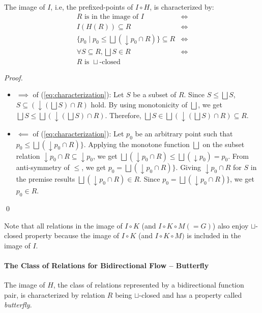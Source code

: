 \documentclass{llncs}
\newcommand{\join}{\sqcup}
\newcommand{\bigjoin}{\bigsqcup}
\newcommand{\comp}{\circ}
\begin{document}
  The image of $I$, i.e, the prefixed-points of $I \comp H$, is characterized by:
  \begin{align}
     R \text{ is in the image of } I &\iff \\
     I(H(R)) \subseteq R &\iff \\
     \{ p_{0} \mid p_{0} \leq \bigjoin (\downarrow p_{0} \cap R) \} \subseteq R &\iff \label{eq:characterization}\\
    \forall S \subseteq R, \bigjoin S \in R &\iff \\
    R \text{ is }\join \text{-closed }
  \end{align}

  \begin{proof} \hfill
    \begin{itemize}
    \item{$\implies$ of (\ref{eq:characterization})}:
    Let $S$ be a subset of $R$. Since $S \leq \bigjoin S$, $S \subseteq (\downarrow (\bigjoin S) \cap R)$ hold. By using monotonicity of $\bigjoin$, we get $\bigjoin S \leq \bigjoin (\downarrow (\bigjoin S) \cap R)$. Therefore, $\bigjoin S \in \bigjoin (\downarrow (\bigjoin S) \cap R) \subseteq R$.
    \item{$\impliedby$ of (\ref{eq:characterization})}:
    Let $p_0$ be an arbitrary point such that $p_{0} \leq \bigjoin (\downarrow p_{0} \cap R) \}$.
    Applying the monotone function $\bigjoin$ on the subset relation $\downarrow p_{0} \cap R \subseteq \downarrow p_{0}$, we get $\bigjoin (\downarrow p_{0} \cap R) \leq \bigjoin (\downarrow p_{0}) = p_{0}$. From anti-symmetry of $\leq$, we get $p_{0} = \bigjoin (\downarrow p_{0} \cap R) \}$.
    Giving $\downarrow p_{0} \cap R$ for $S$ in the premise results $\bigjoin (\downarrow p_{0} \cap R) \in R$. Since $p_{0} = \bigjoin (\downarrow p_{0} \cap R) \}$, we get $p_{0} \in R$.
    \end{itemize}
    \qed
  \end{proof}
  Note that all relations in the image of $I \comp K$ (and $I \comp K \comp M (= G)$) also enjoy $\join$-closed property because the image of $I \comp K$ (and $I \comp K \comp M)$ is included in the image of $I$.

  \paragraph{The Class of Relations for Bidirectional Flow -- Butterfly}
  The image of $H$, the class of relations represented by a bidirectional function pair, is characterized by relation $R$ being $\join$-closed and has a property called \emph{butterfly}.
\end{document}
